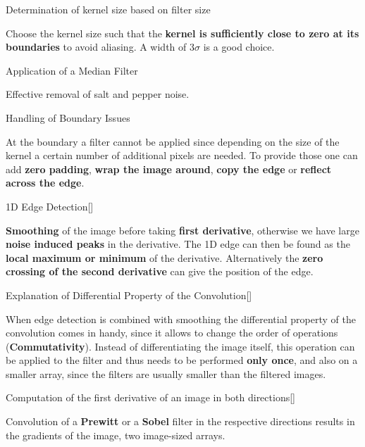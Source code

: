 \documentclass[10pt,a4paper]{scrartcl}
\begin{document}
\begin{multicols*}{2}
\begin{QandA}{Determination of kernel size based on filter size}
\item Choose the kernel size such that the \textbf{kernel is sufficiently close to zero at its boundaries} to avoid aliasing. A width of 3$\sigma$ is a good choice.
\end{QandA}

\begin{QandA}{Application of a Median Filter}
\item Effective removal of salt and pepper noise.
\end{QandA}

\begin{QandA}{Handling of Boundary Issues}
\item At the boundary a filter cannot be applied since depending on the size of the kernel a certain number of additional pixels are needed. To provide those one can add \textbf{zero padding}, \textbf{wrap the image around}, \textbf{copy the edge} or \textbf{reflect across the edge}.
\end{QandA}

\begin{QandA}{1D Edge Detection}[\Derivation]
\item \textbf{Smoothing} of the image before taking \textbf{first derivative}, otherwise we have large \textbf{noise induced peaks} in the derivative. The 1D edge can then be found as the \textbf{local maximum or minimum} of the derivative. Alternatively the \textbf{zero crossing of the second derivative} can give the position of the edge.
\end{QandA}

\begin{QandA}{Explanation of Differential Property of the Convolution}[\Application]
\item When edge detection is combined with smoothing the differential property of the convolution comes in handy, since it allows to change the order of operations (\textbf{Commutativity}). Instead of differentiating the image itself, this operation can be applied to the filter and thus needs to be performed \textbf{only once}, and also on a smaller array, since the filters are usually smaller than the filtered images.
\end{QandA}

\begin{QandA}{Computation of the first derivative of an image in both directions}[\Application]
\item Convolution of a \textbf{Prewitt} or a \textbf{Sobel} filter in the respective directions results in the gradients of the image, two image-sized arrays.
\end{QandA}


\end{multicols*}
\end{document}
